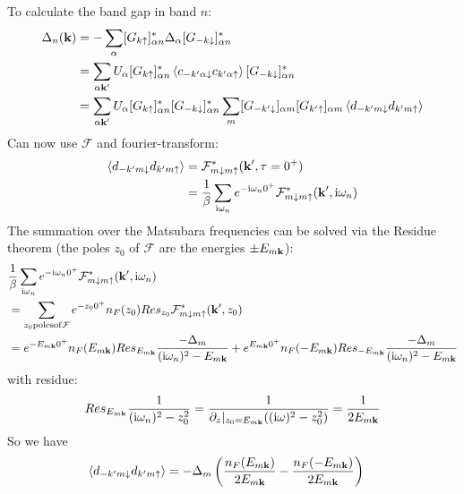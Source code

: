 \documentclass[../main.tex]{subfiles}
\begin{document}
To calculate the band gap in band \(n\):
\begin{align}
    \Delta_n (\bm{\mathrm{k}}) &= -\sum_{\alpha} [G_{k \uparrow}]_{\alpha n}^* \Delta_{\alpha} [G_{-k \downarrow}]_{\alpha n}^* \\
    &= \sum_{\alpha \bm{\mathrm{k}}^{\prime}} U_{\alpha} [G_{k \uparrow}]_{\alpha n}^* \braket{c_{-k^{\prime} \alpha \downarrow} c_{k^{\prime} \alpha \uparrow}} [G_{-k \downarrow}]_{\alpha n}^* \\
    &= \sum_{\alpha \bm{\mathrm{k}}^{\prime}} U_{\alpha} [G_{k \uparrow}]_{\alpha n}^* [G_{-k \downarrow}]_{\alpha n}^* \sum_{m} [G_{-k^{\prime} \downarrow}]_{\alpha m} [G_{k^{\prime} \uparrow}]_{\alpha m} \braket{d_{-k^{\prime} m \downarrow} d_{k^{\prime} m \uparrow}}
\end{align}
Can now use \(\mathcal{F}\) and fourier-transform:
\begin{align}
    \braket{d_{-k^{\prime} m \downarrow} d_{k^{\prime} m \uparrow}} &= \mathcal{F}_{m \downarrow m \uparrow}^* (\bm{\mathrm{k}}^{\prime}, \tau = 0^+) \\
    &= \frac{1}{\beta} \sum_{\mathrm{i} \omega_n} e^{-\mathrm{i} \omega_n 0^+} \mathcal{F}_{m \downarrow m \uparrow}^* (\bm{\mathrm{k}}^{\prime}, \mathrm{i} \omega_n)
\end{align}
The summation over the Matsubara frequencies can be solved via the Residue theorem (the poles \(z_0\) of \(\mathcal{F}\) are the energies \(\pm E_{m \bm{\mathrm{k}}}\)):
\begin{align}
    &\frac{1}{\beta} \sum_{\mathrm{i} \omega_n} e^{-\mathrm{i} \omega_n 0^+} \mathcal{F}_{m \downarrow m \uparrow}^* (\bm{\mathrm{k}}^{\prime}, \mathrm{i} \omega_n) \\
    &= \sum_{z_0 \mathrm{poles of} \mathcal{F}} e^{-z_0 0^+} n_{F} (z_0) Res_{z_0} \mathcal{F}_{m \downarrow m \uparrow}^*  (\bm{\mathrm{k}}^{\prime}, z_0) \\
    &= e^{-E_{m \bm{\mathrm{k}}} 0^+} n_{F} (E_{m \bm{\mathrm{k}}}) Res_{E_{m \bm{\mathrm{k}}}} \frac{-\Delta_{m}}{(\mathrm{i} \omega_n)^2 - E_{m \bm{\mathrm{k}}}}
    + e^{E_{m \bm{\mathrm{k}}} 0^+} n_{F} (-E_{m \bm{\mathrm{k}}}) Res_{-E_{m \bm{\mathrm{k}}}} \frac{-\Delta_{m}}{(\mathrm{i} \omega_n)^2 - E_{m \bm{\mathrm{k}}}}
\end{align}
with residue:
\begin{equation}
    Res_{E_{m \vb{k}}} \frac{1}{(\iu \omega_n)^2 - z_0^2} = \frac{1}{\pdif{z}\vert_{z_0 = E_{m \vb{k}}} ((\iu \omega)^2 - z_0^2)} = \frac{1}{2 E_{m \vb{k}}}
\end{equation}
So we have
\begin{align}
    \braket{d_{-k^{\prime} m \downarrow} d_{k^{\prime} m \uparrow}} &= -\Delta_m \left(\frac{n_F (E_{m \bm{\mathrm{k}}})}{2 E_{m \bm{\mathrm{k}}}} - \frac{n_F (-E_{m \bm{\mathrm{k}}})}{2 E_{m \bm{\mathrm{k}}}}\right)
\end{align}
\end{document}
